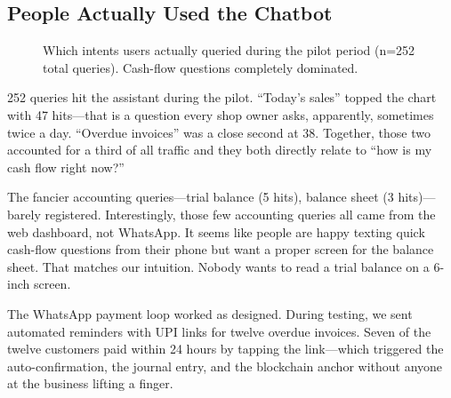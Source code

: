 \documentclass[conference]{IEEEtran}
\begin{document}
\subsection{People Actually Used the Chatbot}

\begin{figure}[htbp]
\begin{center}
\end{center}
\caption{Which intents users actually queried during the pilot period (n=252 total queries). Cash-flow questions completely dominated.}
\label{fig_intent}
\end{figure}

252 queries hit the assistant during the pilot. ``Today's sales'' topped the chart with 47 hits---that is a question every shop owner asks, apparently, sometimes twice a day. ``Overdue invoices'' was a close second at 38. Together, those two accounted for a third of all traffic and they both directly relate to ``how is my cash flow right now?''

The fancier accounting queries---trial balance (5 hits), balance sheet (3 hits)---barely registered. Interestingly, those few accounting queries all came from the web dashboard, not WhatsApp. It seems like people are happy texting quick cash-flow questions from their phone but want a proper screen for the balance sheet. That matches our intuition. Nobody wants to read a trial balance on a 6-inch screen.

The WhatsApp payment loop worked as designed. During testing, we sent automated reminders with UPI links for twelve overdue invoices. Seven of the twelve customers paid within 24 hours by tapping the link---which triggered the auto-confirmation, the journal entry, and the blockchain anchor without anyone at the business lifting a finger.
\end{document}
